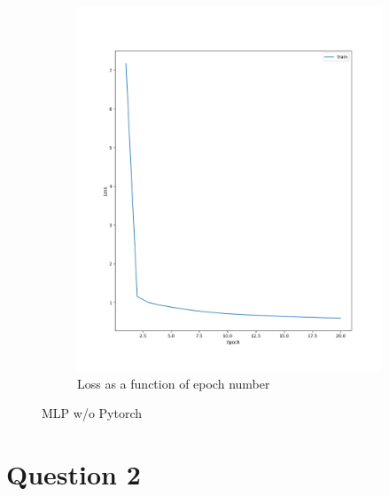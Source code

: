 \documentclass[11pt]{article}
\begin{document}
\begin{figure}
\begin{subfigure}{.5\textwidth}
  \includegraphics[width=.9\linewidth]{./plots/mlp_loss_per_epoch.png}
  \caption{Loss as a function of epoch number}
\end{subfigure}
\caption{MLP w/o Pytorch}
\label{fig:mlp2b}
\end{figure}
\pagebreak
\section{Question 2}
\end{document}
